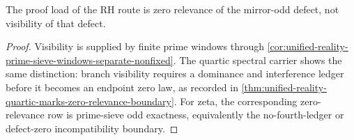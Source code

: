 \begin{corollary}
\label{cor:unified-reality-zero-relevance-proof-load}
The proof load of the RH route is zero relevance of the mirror-odd
defect, not visibility of that defect.
\end{corollary}

\begin{proof}
Visibility is supplied by finite prime windows through
\autoref{cor:unified-reality-prime-sieve-windows-separate-nonfixed}.  The
quartic spectral carrier shows the same distinction: branch visibility
requires a dominance and interference ledger before it becomes an endpoint
zero law, as recorded in
\autoref{thm:unified-reality-quartic-marks-zero-relevance-boundary}.  For
zeta, the corresponding zero-relevance row is prime-sieve odd exactness,
equivalently the no-fourth-ledger or defect-zero incompatibility boundary.
\end{proof}
